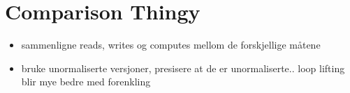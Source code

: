 \section{Comparison Thingy}
\begin{itemize}
  \item sammenligne reads, writes og computes mellom de forskjellige m\aa tene
  \item bruke unormaliserte versjoner, presisere at de er unormaliserte.. loop lifting blir mye bedre med
  forenkling
  \end{itemize}
